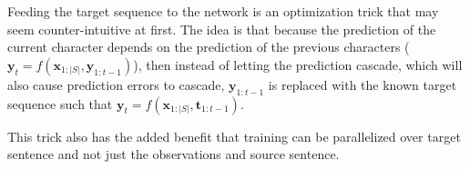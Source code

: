 Feeding the target sequence to the network is an optimization trick that may seem counter-intuitive at first. The idea is that because the prediction of the current character depends on the prediction of the previous characters ($\mathbf{y}_t = f(\mathbf{x}_{1:|S|}, \mathbf{y}_{1:t-1})$), then instead of letting the prediction cascade, which will also cause prediction errors to cascade, $\mathbf{y}_{1:t-1}$ is replaced with the known target sequence such that $\mathbf{y}_t = f(\mathbf{x}_{1:|S|}, \mathbf{t}_{1:t-1})$.

This trick also has the added benefit that training can be parallelized over target sentence and not just the observations and source sentence. 

